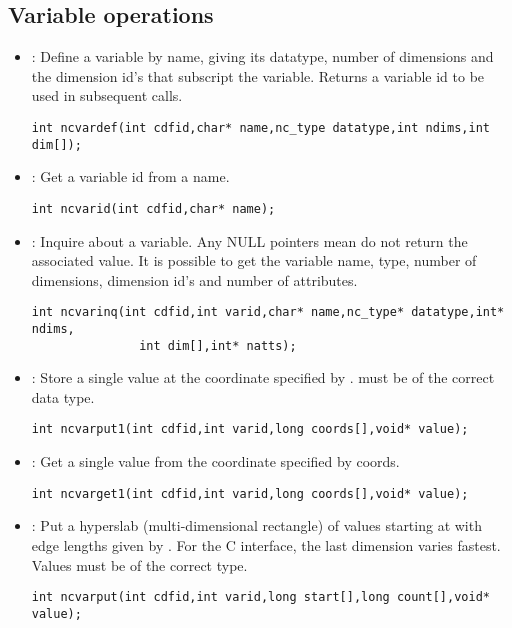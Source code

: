\subsection{Variable operations}

\begin{itemize}

\item {} : Define a variable by name, giving its datatype, number
of dimensions 
and the dimension id's that subscript the variable. Returns a variable
id to be used in subsequent calls.
\begin{verbatim}
int ncvardef(int cdfid,char* name,nc_type datatype,int ndims,int dim[]);
\end{verbatim}

\item {} : Get a variable id from a name. 
\begin{verbatim}
int ncvarid(int cdfid,char* name);
\end{verbatim}

\item {} : Inquire about a variable. Any NULL pointers mean do
not return the 
associated value. It is possible to get the variable name, type,
number of dimensions, dimension id's and number of attributes.
\begin{verbatim}
int ncvarinq(int cdfid,int varid,char* name,nc_type* datatype,int* ndims,
               int dim[],int* natts);
\end{verbatim}

\item {} : Store a single value at the coordinate specified by
. 
 must be of the correct data type.
\begin{verbatim}
int ncvarput1(int cdfid,int varid,long coords[],void* value);
\end{verbatim}

\item {} : Get a single value from the coordinate specified by
coords. 
\begin{verbatim}
int ncvarget1(int cdfid,int varid,long coords[],void* value);
\end{verbatim}

\item {} : Put a hyperslab (multi-dimensional rectangle) of
values starting at 
 with edge lengths given by . For the C
interface, the last dimension varies fastest. Values must be of the
correct type.
\begin{verbatim}
int ncvarput(int cdfid,int varid,long start[],long count[],void* value);
\end{verbatim}


\end{itemize}
